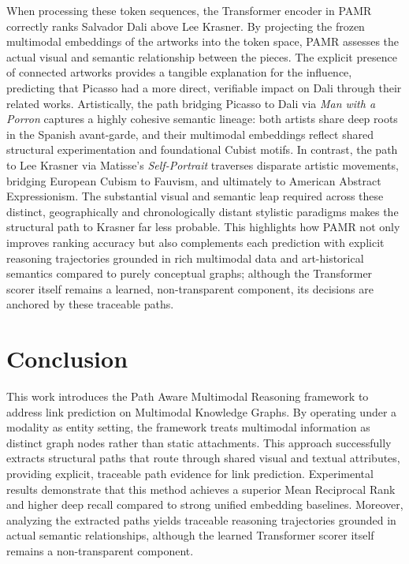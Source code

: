 \documentclass[runningheads]{llncs}
\begin{document}
When processing these token sequences, the Transformer encoder in PAMR correctly ranks Salvador Dali above Lee Krasner. By projecting the frozen multimodal embeddings of the artworks into the token space, PAMR assesses the actual visual and semantic relationship between the pieces. The explicit presence of connected artworks provides a tangible explanation for the influence, predicting that Picasso had a more direct, verifiable impact on Dali through their related works. Artistically, the path bridging Picasso to Dali via \textit{Man with a Porron} captures a highly cohesive semantic lineage: both artists share deep roots in the Spanish avant-garde, and their multimodal embeddings reflect shared structural experimentation and foundational Cubist motifs. In contrast, the path to Lee Krasner via Matisse's \textit{Self-Portrait} traverses disparate artistic movements, bridging European Cubism to Fauvism, and ultimately to American Abstract Expressionism. The substantial visual and semantic leap required across these distinct, geographically and chronologically distant stylistic paradigms makes the structural path to Krasner far less probable. This highlights how PAMR not only improves ranking accuracy but also complements each prediction with explicit reasoning trajectories grounded in rich multimodal data and art-historical semantics compared to purely conceptual graphs; although the Transformer scorer itself remains a learned, non-transparent component, its decisions are anchored by these traceable paths.

\section{Conclusion}
\label{sec:conclusion}

This work introduces the Path Aware Multimodal Reasoning framework to address link prediction on Multimodal Knowledge Graphs. By operating under a modality as entity setting, the framework treats multimodal information as distinct graph nodes rather than static attachments. This approach successfully extracts structural paths that route through shared visual and textual attributes, providing explicit, traceable path evidence for link prediction. Experimental results demonstrate that this method achieves a superior Mean Reciprocal Rank and higher deep recall compared to strong unified embedding baselines. Moreover, analyzing the extracted paths yields traceable reasoning trajectories grounded in actual semantic relationships, although the learned Transformer scorer itself remains a non-transparent component.
\end{document}
